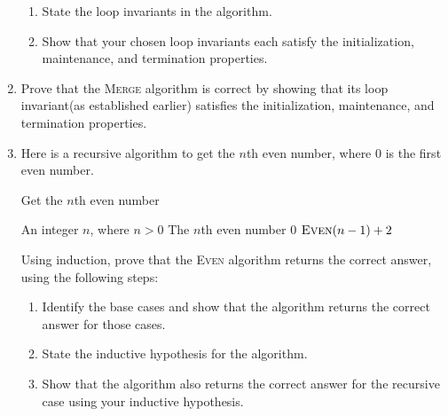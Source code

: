 \begin{exercises}
\begin{enumerate}
        \begin{enumerate}
            \item State the loop invariants in the algorithm.
            \item Show that your chosen loop invariants each satisfy the initialization, maintenance, and termination properties.
        \end{enumerate}

    \item[\challenge] Prove that the \textsc{Merge} algorithm is correct by showing that its loop invariant(as established earlier) satisfies the initialization, maintenance, and termination properties.

    \item Here is a recursive algorithm to get the $n$th even number, where $0$ is the first even number.
    \begin{algorithm}[H]
        \caption{Get the $n$th even number}
        \begin{algorithmic}[1]
            \Require An integer $n$, where $n>0$
            \Ensure The $n$th even number
                    \Return $0$
                \Else
                    \Return $\text{\Call{Even}{$n-1$}} + 2$
                \EndIf
            \EndFunction
        \end{algorithmic}
    \end{algorithm}
        Using induction, prove that the \textsc{Even} algorithm returns the correct answer, using the following steps:
        \begin{enumerate}
            \item Identify the base cases and show that the algorithm returns the correct answer for those cases.
            \item State the inductive hypothesis for the algorithm.
            \item Show that the algorithm also returns the correct answer for the recursive case using your inductive hypothesis.
        \end{enumerate}


\end{enumerate}
\end{exercises}
